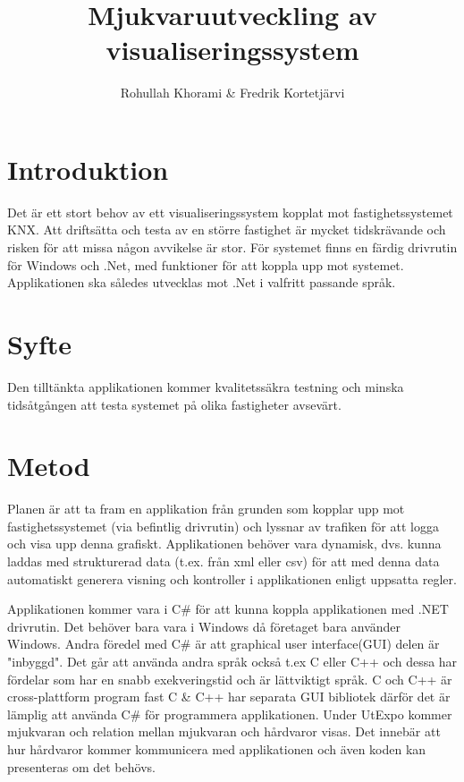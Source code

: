 \documentclass{article}
\title{Mjukvaruutveckling av visualiseringssystem}
\author{Rohullah Khorami \& Fredrik Kortetjärvi }
\begin{document}
\maketitle

\section{Introduktion}Det är ett stort behov av ett visualiseringssystem kopplat mot fastighetssystemet KNX. Att driftsätta och testa av
en större fastighet är mycket tidskrävande och risken för att missa någon avvikelse är stor. 
För systemet finns en färdig drivrutin för Windows och .Net, med funktioner för att koppla upp mot systemet.
Applikationen ska således utvecklas mot .Net i valfritt passande språk.

\section{Syfte}Den tilltänkta applikationen kommer kvalitetssäkra testning och minska tidsåtgången att testa systemet på olika fastigheter avsevärt.

\section{Metod}
Planen är att ta fram en applikation från grunden som kopplar upp mot
fastighetssystemet (via befintlig drivrutin) och lyssnar av trafiken för att logga och visa upp denna grafiskt.
Applikationen behöver vara dynamisk, dvs. kunna laddas med strukturerad data (t.ex. från xml eller csv) för att
med denna data automatiskt generera visning och kontroller i applikationen enligt uppsatta regler.\newline

Applikationen kommer vara i C\# för att kunna koppla applikationen med .NET drivrutin. Det behöver bara vara i Windows då företaget bara använder Windows. Andra föredel med C\# är att graphical user interface(GUI) delen är "inbyggd". Det går att använda andra språk också t.ex C eller C++ och dessa har fördelar som har en snabb exekveringstid och är lättviktigt språk. C och C++ är cross-plattform program fast C \& C++ har separata GUI bibliotek därför det är lämplig att använda C\# för programmera applikationen.\newline 
Under UtExpo kommer mjukvaran och relation mellan mjukvaran och hårdvaror visas. Det innebär att hur hårdvaror kommer kommunicera med applikationen och även koden kan presenteras om det behövs.
\end{document}
